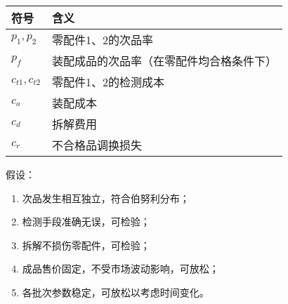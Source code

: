 \begin{table}[htbp]\centering
\begin{tabular}{ll}
\toprule
符号 & 含义 \\
\midrule
$ p_1, p_2 $ & 零配件1、2的次品率 \\
$ p_f $ & 装配成品的次品率（在零配件均合格条件下） \\
$ c_{t1}, c_{t2} $ & 零配件1、2的检测成本 \\
$ c_a $ & 装配成本 \\
$ c_d $ & 拆解费用 \\
$ c_r $ & 不合格品调换损失 \\
\bottomrule
\end{tabular}
\end{table}

假设：
\begin{enumerate}
  \item 次品发生相互独立，符合伯努利分布；
  \item 检测手段准确无误，可检验；
  \item 拆解不损伤零配件，可检验；
  \item 成品售价固定，不受市场波动影响，可放松；
  \item 各批次参数稳定，可放松以考虑时间变化。
\end{enumerate}
